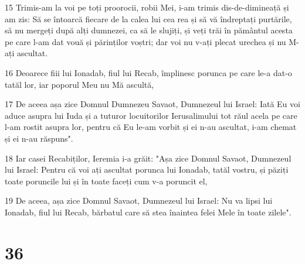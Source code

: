 \par 15 Trimis-am la voi pe toți proorocii, robii Mei, i-am trimis dis-de-dimineață și am zis: Să se întoarcă fiecare de la calea lui cea rea și să vă îndreptați purtările, să nu mergeți după alți dumnezei, ca să le slujiți, și veți trăi în pământul acesta pe care l-am dat vouă și părinților voștri; dar voi nu v-ați plecat urechea și nu M-ați ascultat.
\par 16 Deoarece fiii lui Ionadab, fiul lui Recab, împlinesc porunca pe care le-a dat-o tatăl lor, iar poporul Meu nu Mă ascultă,
\par 17 De aceea așa zice Domnul Dumnezeu Savaot, Dumnezeul lui Israel: Iată Eu voi aduce asupra lui Iuda și a tuturor locuitorilor Ierusalimului tot răul acela pe care l-am rostit asupra lor, pentru că Eu le-am vorbit și ei n-au ascultat, i-am chemat și ei n-au răspuns".
\par 18 Iar casei Recabiților, Ieremia i-a grăit: "Așa zice Domnul Savaot, Dumnezeul lui Israel: Pentru că voi ați ascultat porunca lui Ionadab, tatăl vostru, și păziți toate poruncile lui și în toate faceți cum v-a poruncit el,
\par 19 De aceea, așa zice Domnul Savaot, Dumnezeul lui Israel: Nu va lipsi lui Ionadab, fiul lui Recab, bărbatul care să stea înaintea felei Mele în toate zilele".

\chapter{36}


